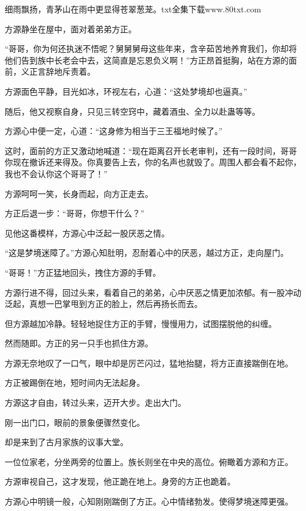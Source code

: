 
\begin{this_body}

细雨飘扬，青茅山在雨中更显得苍翠葱茏。txt全集下载www.80txt.com

方源静坐在屋中，面对着弟弟方正。

“哥哥，你为何还执迷不悟呢？舅舅舅母这些年来，含辛茹苦地养育我们，你却将他们告到族中长老会中去，这简直是忘恩负义啊！”方正昂首挺胸，站在方源的面前，义正言辞地斥责着。

方源面色平静，目光如冰，环视左右，心道：“这处梦境却也逼真。”

随后，他又视察自身，只见三转空窍中，藏着酒虫、全力以赴蛊等等。

方源心中便一定，心道：“这身修为相当于三王福地时候了。”

这时，面前的方正又激动地喊道：“现在距离召开长老审判，还有一段时间，哥哥你现在撤诉还来得及。你真要告上去，你的名声也就毁了。周围人都会看不起你，我也不会认你这个哥哥了！”

方源呵呵一笑，长身而起，向方正走去。

方正后退一步：“哥哥，你想干什么？”

见他这番模样，方源心中泛起一股厌恶之情。

“这是梦境迷障了。”方源心知肚明，忍耐着心中的厌恶，越过方正，走向屋门。

“哥哥！”方正猛地回头，拽住方源的手臂。

方源行进不得，回过头来，看着自己的弟弟，心中厌恶之情更加浓郁。有一股冲动泛起，真想一巴掌甩到方正的脸上，然后再扬长而去。

但方源越加冷静。轻轻地捉住方正的手臂，慢慢用力，试图摆脱他的纠缠。

然而随即。方正的另一只手也抓住方源。

方源无奈地叹了一口气，眼中却是厉芒闪过，猛地抬腿，将方正直接踹倒在地。

方正被踢倒在地，短时间内无法起身。

方源这才自由，转过头来，迈开大步。走出大门。

刚一出门口，眼前的景象便骤然变化。

却是来到了古月家族的议事大堂。

一位位家老，分坐两旁的位置上。族长则坐在中央的高位。俯瞰着方源和方正。

方源审视自己，这才发现，他正跪在地上。身旁的方正也跪着。

方源心中明镜一般，心知刚刚踹倒了方正。心中情绪勃发。使得梦境迷障更强。


\end{this_body}
